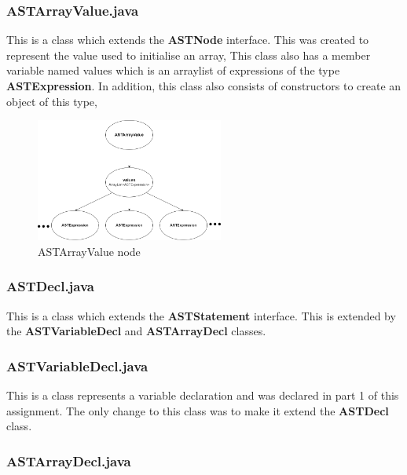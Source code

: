 \documentclass{article}
\begin{document}
							\subsubsection{ASTArrayValue.java}
					
					This is a class which extends the \textbf{ASTNode} interface. This was created to represent the value used to initialise an array, This class also has a member variable named values which is an arraylist of expressions of the type \textbf{ASTExpression}. In addition, this class also consists of constructors to create an object of this type,
					
								\begin{figure}[H]
					\centering
			 			\includegraphics[width=0.55\textwidth]{astarrayvalue.png}
			  			\caption{ASTArrayValue node}
			  			\label{fig:astarrayvalue}
					\end{figure}					
					
										\subsubsection{ASTDecl.java}
					
					This is a class which extends the \textbf{ASTStatement} interface. This is extended by the \textbf{ASTVariableDecl} and \textbf{ASTArrayDecl} classes.
					
										\subsubsection{ASTVariableDecl.java}
					
					This is a class represents a variable declaration and was declared in part 1 of this assignment. The only change to this class was to make it extend the \textbf{ASTDecl} class.
					
					\subsubsection{ASTArrayDecl.java}
					
\end{document}
